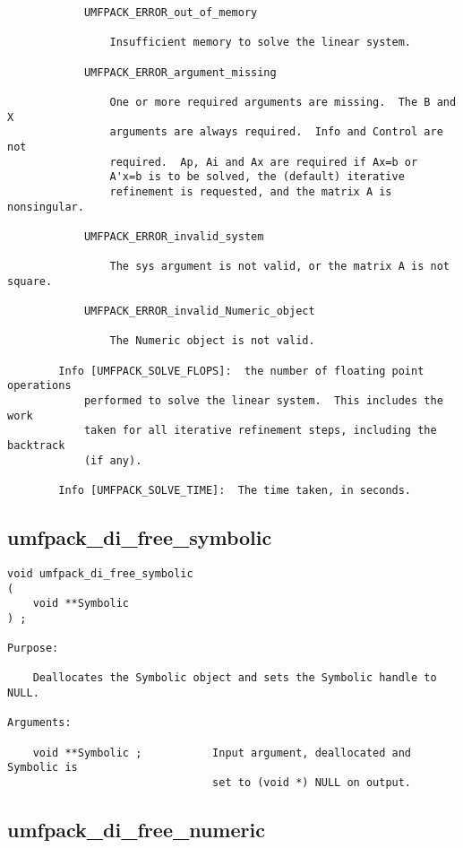 \documentclass[11pt]{article}
\begin{document}
{\begin{verbatim}
            UMFPACK_ERROR_out_of_memory

                Insufficient memory to solve the linear system.

            UMFPACK_ERROR_argument_missing

                One or more required arguments are missing.  The B and X
                arguments are always required.  Info and Control are not
                required.  Ap, Ai and Ax are required if Ax=b or
                A'x=b is to be solved, the (default) iterative
                refinement is requested, and the matrix A is nonsingular.

            UMFPACK_ERROR_invalid_system

                The sys argument is not valid, or the matrix A is not square.

            UMFPACK_ERROR_invalid_Numeric_object

                The Numeric object is not valid.

        Info [UMFPACK_SOLVE_FLOPS]:  the number of floating point operations
            performed to solve the linear system.  This includes the work
            taken for all iterative refinement steps, including the backtrack
            (if any).

        Info [UMFPACK_SOLVE_TIME]:  The time taken, in seconds.
\end{verbatim}
}


\newpage

\subsection{umfpack\_di\_free\_symbolic}
{\footnotesize
\begin{verbatim}
void umfpack_di_free_symbolic
(
    void **Symbolic
) ;

Purpose:

    Deallocates the Symbolic object and sets the Symbolic handle to NULL.

Arguments:

    void **Symbolic ;           Input argument, deallocated and Symbolic is
                                set to (void *) NULL on output.
\end{verbatim}
}

\subsection{umfpack\_di\_free\_numeric}
\end{document}

